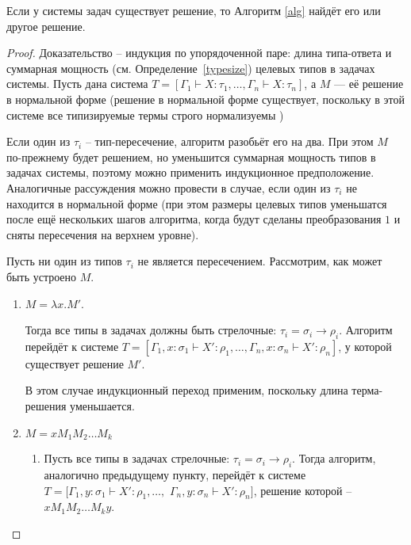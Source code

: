 \documentclass[../main.tex]{subfiles}
\begin{document}
\begin{theorem}[Completeness] \label{completeness}
Если у системы задач существует решение, то Алгоритм \ref{alg} найдёт его или другое решение. 
\end{theorem}
\begin{proof}
Доказательство -- индукция по упорядоченной паре: длина типа-ответа и суммарная мощность (см. Определение~\ref{typesize}) целевых типов в задачах системы.
Пусть дана система $T = [\Gamma_1 \vdash X \colon \tau_1 ,\dots, \Gamma_n \vdash X \colon \tau_n]$, а $M$ --- её решение в нормальной форме (решение в нормальной форме существует, поскольку в этой системе все типизируемые термы строго нормализуемы \cite{pottinger_1980})

Если один из $\tau_i$ -- тип-пересечение, алгоритм разобьёт его на два. При этом $M$ по-прежнему будет решением, но уменьшится суммарная мощность типов в задачах системы, поэтому можно применить индукционное предположение. Аналогичные рассуждения можно провести в случае, если один из $\tau_i$ не находится в нормальной форме (при этом размеры целевых типов уменьшатся после ещё нескольких шагов алгоритма, когда будут сделаны преобразования $1$ и сняты пересечения на верхнем уровне).

Пусть ни один из типов $\tau_i$ не является пересечением. 
Рассмотрим, как может быть устроено $M$.
\begin{enumerate}
    \item $M = \lambda x . M'$. 
    
    Тогда все типы в задачах должны быть стрелочные: $\tau_i = \sigma_i \to \rho_i$. Алгоритм перейдёт к системе $T = [\Gamma_1, x \colon \sigma_1 \vdash X' \colon \rho_1 ,\dots, \Gamma_n, x \colon \sigma_n \vdash X' \colon \rho_n]$, у которой существует решение $M'$.
    
    В этом случае индукционный переход применим, поскольку длина терма-решения уменьшается.
    
    \item $M = x M_1 M_2 \dots M_k$
        \begin{enumerate}
            \item \label{case:a} Пусть все типы в задачах стрелочные: $\tau_i = \sigma_i \to \rho_i$. 
                Тогда алгоритм, аналогично предыдущему пункту, перейдёт к системе $T = [\Gamma_1, y \colon \sigma_1 \vdash X' \colon \rho_1 ,\dots, $ $ \Gamma_n, y \colon \sigma_n \vdash X' \colon \rho_n]$, решение которой -- $x M_1 M_2 \dots M_k y$.
            

\end{enumerate}
\end{enumerate}
\end{proof}
\end{document}
